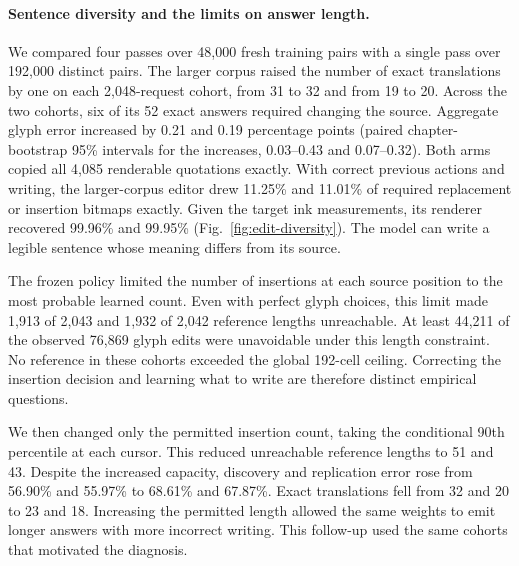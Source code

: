 \paragraph{Sentence diversity and the limits on answer length.}
We compared four passes over 48,000 fresh training pairs with a single pass over 192,000 distinct pairs. The larger corpus raised the number of exact translations by one on each 2,048-request cohort, from 31 to 32 and from 19 to 20. Across the two cohorts, six of its 52 exact answers required changing the source. Aggregate glyph error increased by 0.21 and 0.19 percentage points (paired chapter-bootstrap 95\% intervals for the increases, 0.03--0.43 and 0.07--0.32). Both arms copied all 4,085 renderable quotations exactly. With correct previous actions and writing, the larger-corpus editor drew 11.25\% and 11.01\% of required replacement or insertion bitmaps exactly. Given the target ink measurements, its renderer recovered 99.96\% and 99.95\% (Fig.~\ref{fig:edit-diversity}). The model can write a legible sentence whose meaning differs from its source.

The frozen policy limited the number of insertions at each source position to the most probable learned count. Even with perfect glyph choices, this limit made 1,913 of 2,043 and 1,932 of 2,042 reference lengths unreachable. At least 44,211 of the observed 76,869 glyph edits were unavoidable under this length constraint. No reference in these cohorts exceeded the global 192-cell ceiling. Correcting the insertion decision and learning what to write are therefore distinct empirical questions.

We then changed only the permitted insertion count, taking the conditional 90th percentile at each cursor. This reduced unreachable reference lengths to 51 and 43. Despite the increased capacity, discovery and replication error rose from 56.90\% and 55.97\% to 68.61\% and 67.87\%. Exact translations fell from 32 and 20 to 23 and 18. Increasing the permitted length allowed the same weights to emit longer answers with more incorrect writing. This follow-up used the same cohorts that motivated the diagnosis.
